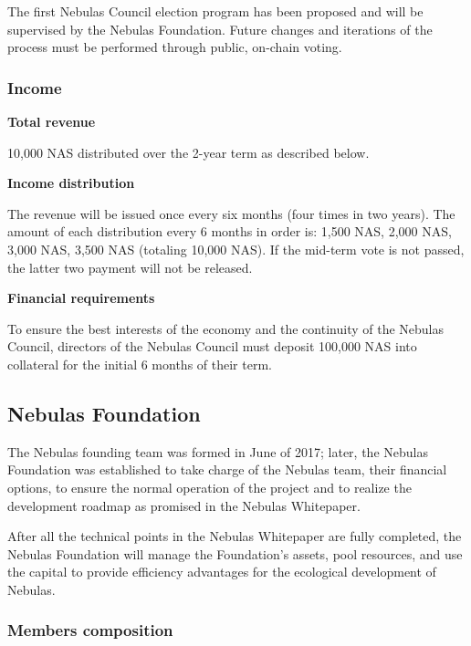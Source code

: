 The first Nebulas Council election program has been proposed and will be supervised by the Nebulas Foundation. Future changes and iterations of the process must be performed through public, on-chain voting.

\subsubsection{Income}

\textbf{Total revenue}

10,000 NAS distributed over the 2-year term as described below.

\vspace{2em}

\textbf{Income distribution}

The revenue will be issued once every six months (four times in two years). The amount of each distribution every 6 months in order is: 1,500 NAS, 2,000 NAS, 3,000 NAS, 3,500 NAS (totaling 10,000 NAS). If the mid-term vote is not passed, the latter two payment will not be released.

\vspace{2em}

\textbf{Financial requirements}

To ensure the best interests of the economy and the continuity of the Nebulas Council, directors of the Nebulas Council must deposit 100,000 NAS into collateral for the initial 6 months of their term.

\vspace{2em}

\subsection{Nebulas Foundation}

The Nebulas founding team was formed in June of 2017; later, the Nebulas Foundation was established to take charge of the Nebulas team, their financial options, to ensure the normal operation of the project and to realize the development roadmap as promised in the Nebulas Whitepaper.

After all the technical points in the Nebulas Whitepaper are fully completed, the Nebulas Foundation will manage the Foundation’s assets, pool resources, and use the capital to provide efficiency advantages for the ecological development of Nebulas.

\subsubsection{Members composition}

